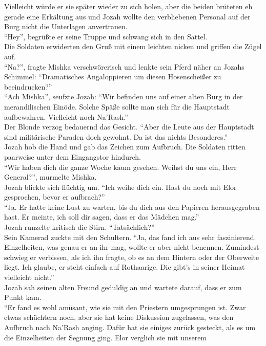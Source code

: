 Vielleicht würde er sie später wieder zu sich holen, aber die beiden brüteten eh gerade eine 
Erkältung aus und Jozah wollte den verbliebenen Personal auf der Burg nicht die Unterlagen 
anvertrauen.\\
``Hey'', begrüßte er seine Truppe und schwang sich in den Sattel.\\
Die Soldaten erwiderten den Gruß mit einem leichten nicken und griffen die Zügel auf.\\
``Na?'', fragte Mishka verschwörerisch und lenkte sein Pferd näher an Jozahs Schimmel: 
``Dramatisches Angaloppieren um diesen Hosenscheißer zu beeindrucken?''\\
``Ach Mishka'', seufzte Jozah: ``Wir befinden uns auf einer alten Burg in der merandilischen 
Einöde. Solche Späße sollte man sich für die Hauptstadt aufbewahren. Vielleicht noch Na'Rash.''\\
Der Blonde verzog bedauernd das Gesicht. ``Aber die Leute aus der Hauptstadt sind militärische 
Paraden doch gewohnt. Da ist das nichts Besonderes.''\\
Jozah hob die Hand und gab das Zeichen zum Aufbruch. Die Soldaten ritten paarweise unter dem 
Eingangstor hindurch.\\
``Wir haben dich die ganze Woche kaum gesehen. Weihst du uns ein, Herr General?'', murmelte 
Mishka.\\
Jozah blickte sich flüchtig um. ``Ich weihe dich ein. Hast du noch mit Elor gesprochen, bevor er 
aufbrach?''\\
``Ja. Er hatte keine Lust zu warten, bis du dich aus den Papieren herausgegraben hast. Er meinte, 
ich soll dir sagen, dass er das Mädchen mag.''\\
Jozah runzelte kritisch die Stirn. ``Tatsächlich?''\\
Sein Kamerad zuckte mit den Schultern. ``Ja, das fand ich aus sehr faszinierend. Einzelheiten, was 
genau er an ihr mag, wollte er aber nicht benennen. Zumindest schwieg er verbissen, als ich ihn 
fragte, ob es an dem Hintern oder der Oberweite liegt. Ich glaube, er steht einfach auf Rothaarige. 
Die gibt's in seiner Heimat vielleicht nicht.''\\
Jozah sah seinen alten Freund geduldig an und wartete darauf, dass er zum Punkt kam.\\
``Er fand es wohl amüsant, wie sie mit den Priestern umgesprungen ist. Zwar etwas schüchtern noch, 
aber sie hat keine Diskussion zugelassen, was den Aufbruch nach Na'Rash anging. Dafür hat sie 
einiges zurück gesteckt, als es um die Einzelheiten der Segnung ging. Elor verglich sie mit unserem 
